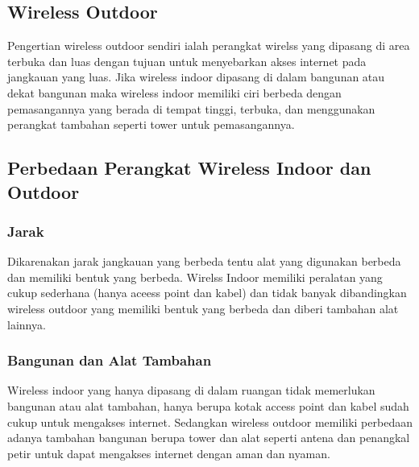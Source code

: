 \documentclass[a4paper,12pt]{article}
\begin{document}
\subsection{Wireless Outdoor}
Pengertian wireless outdoor sendiri ialah perangkat wirelss yang dipasang di area terbuka dan luas dengan tujuan untuk
menyebarkan akses internet pada jangkauan yang luas. Jika wireless indoor dipasang di dalam bangunan atau dekat bangunan
maka wireless indoor memiliki ciri berbeda dengan pemasangannya yang berada di tempat tinggi, terbuka, dan menggunakan
perangkat tambahan seperti tower untuk pemasangannya.

\subsection{Perbedaan Perangkat Wireless Indoor dan Outdoor}
\subsubsection{Jarak}
Dikarenakan jarak jangkauan yang berbeda tentu alat yang digunakan berbeda dan memiliki bentuk yang berbeda. Wirelss Indoor
memiliki peralatan yang cukup sederhana (hanya aceess point dan kabel) dan tidak banyak dibandingkan wireless outdoor yang
memiliki bentuk yang berbeda dan diberi tambahan alat lainnya.

\subsubsection{Bangunan dan Alat Tambahan}
Wireless indoor yang hanya dipasang di dalam ruangan tidak memerlukan bangunan atau alat tambahan, hanya berupa kotak access
point dan kabel sudah cukup untuk mengakses internet. Sedangkan wireless outdoor memiliki perbedaan adanya tambahan bangunan
berupa tower dan alat seperti antena dan penangkal petir untuk dapat mengakses internet dengan aman dan nyaman.
\end{document}
